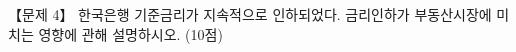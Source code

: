\begin{longquestion}{【문제 4】}
한국은행 기준금리가 지속적으로 인하되었다. 금리인하가 부동산시장에 미치는 영향에 관해 설명하시오. (10점) \par
\end{longquestion}
